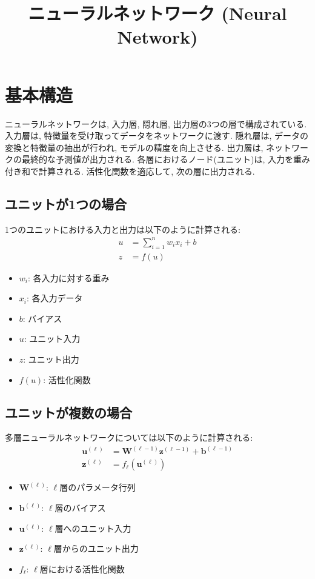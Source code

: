 \documentclass[dvipdfmx, 10pt]{jsarticle}
\title{\textbf{ニューラルネットワーク (Neural Network)}}
\author{}
\date{}
\begin{document}
\maketitle

\section*{基本構造}
ニューラルネットワークは, 入力層, 隠れ層, 出力層の3つの層で構成されている. 
入力層は, 特徴量を受け取ってデータをネットワークに渡す. 隠れ層は, データの変換と特徴量の抽出が行われ, モデルの精度を向上させる. 
出力層は, ネットワークの最終的な予測値が出力される. 
各層におけるノード(ユニット)は, 入力を重み付き和で計算される. 活性化関数を適応して, 次の層に出力される. 

\begin{framed}
\subsection*{ユニットが1つの場合}
1つのユニットにおける入力と出力は以下のように計算される: 
\begin{align*}
    u &= \sum_{i=1}^n w_i x_i + b \\
    z &= f(u)
\end{align*}

\begin{itemize}
    \item $w_i$: 各入力に対する重み
    \item $x_i$: 各入力データ
    \item $b$: バイアス
    \item $u$: ユニット入力
    \item $z$: ユニット出力
    \item $f(u)$: 活性化関数
\end{itemize}

\subsection*{ユニットが複数の場合}
多層ニューラルネットワークについては以下のように計算される: 
\begin{align*}
    \mathbf{u}^{(\ell)} &= \mathbf{W}^{(\ell-1)} \mathbf{z}^{(\ell-1)} + \mathbf{b}^{(\ell-1)} \\
    \mathbf{z}^{(\ell)} &= f_{\ell}(\mathbf{u}^{(\ell)})
\end{align*}

\begin{itemize}
    \item $\mathbf{W}^{(\ell)}$: $\ell$層のパラメータ行列
    \item $\mathbf{b}^{(\ell)}$: $\ell$層のバイアス
    \item $\mathbf{u}^{(\ell)}$: $\ell$層へのユニット入力
    \item $\mathbf{z}^{(\ell)}$: $\ell$層からのユニット出力
    \item $f_{\ell}$: $\ell$層における活性化関数
\end{itemize}

\end{framed}
\end{document}
